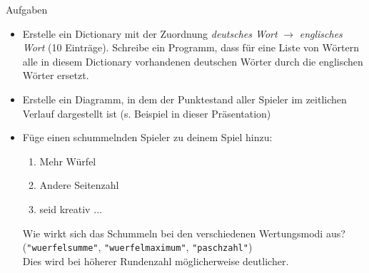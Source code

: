 \begin{frame}{Aufgaben}
    \begin{itemize}
        \item Erstelle ein Dictionary mit der Zuordnung \emph{deutsches Wort} $\rightarrow$ \emph{englisches Wort} (10 Einträge). Schreibe ein Programm, dass für eine Liste von Wörtern alle in diesem Dictionary vorhandenen deutschen Wörter durch die englischen Wörter ersetzt.
        \item Erstelle ein Diagramm, in dem der Punktestand aller Spieler im zeitlichen Verlauf dargestellt ist (s. Beispiel in dieser Präsentation)
        \item Füge einen schummelnden Spieler zu deinem Spiel hinzu:
            \begin{enumerate}
                \item Mehr Würfel
                \item Andere Seitenzahl
                \item seid kreativ $\dots$
            \end{enumerate}
            Wie wirkt sich das Schummeln bei den verschiedenen Wertungsmodi aus? \\
            (\texttt{"wuerfelsumme"}, \texttt{"wuerfelmaximum"}, \texttt{"paschzahl"})\\
            Dies wird bei höherer Rundenzahl möglicherweise deutlicher.

    \end{itemize}
\end{frame}

